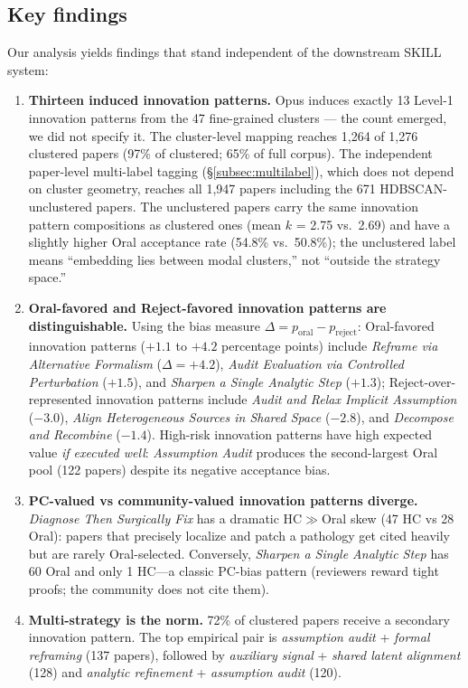 \documentclass[10pt,a4paper]{article}
\begin{document}
\subsection{Key findings}

Our analysis yields findings that stand independent of the downstream SKILL system:

\begin{enumerate}[leftmargin=1.5em]
\item \textbf{Thirteen induced innovation patterns.} Opus induces exactly 13 Level-1 innovation patterns from the 47 fine-grained clusters --- the count emerged, we did not specify it. The cluster-level mapping reaches 1{,}264 of 1{,}276 clustered papers (97\% of clustered; 65\% of full corpus). The independent paper-level multi-label tagging (\S\ref{subsec:multilabel}), which does not depend on cluster geometry, reaches all 1{,}947 papers including the 671 HDBSCAN-unclustered papers. The unclustered papers carry the same innovation pattern compositions as clustered ones (mean $k$ = 2.75 vs.\ 2.69) and have a slightly higher Oral acceptance rate (54.8\% vs.\ 50.8\%); the unclustered label means ``embedding lies between modal clusters,'' not ``outside the strategy space.''
\item \textbf{Oral-favored and Reject-favored innovation patterns are distinguishable.} Using the bias measure $\Delta = p_\text{oral} - p_\text{reject}$: Oral-favored innovation patterns (${+}1.1$ to ${+}4.2$ percentage points) include \emph{Reframe via Alternative Formalism} ($\Delta{=}{+}4.2$), \emph{Audit Evaluation via Controlled Perturbation} (${+}1.5$), and \emph{Sharpen a Single Analytic Step} (${+}1.3$); Reject-over-represented innovation patterns include \emph{Audit and Relax Implicit Assumption} (${-}3.0$), \emph{Align Heterogeneous Sources in Shared Space} (${-}2.8$), and \emph{Decompose and Recombine} (${-}1.4$). High-risk innovation patterns have high expected value \emph{if executed well}: \emph{Assumption Audit} produces the second-largest Oral pool (122 papers) despite its negative acceptance bias.
\item \textbf{PC-valued vs community-valued innovation patterns diverge.} \emph{Diagnose Then Surgically Fix} has a dramatic HC$\gg$Oral skew (47 HC vs 28 Oral): papers that precisely localize and patch a pathology get cited heavily but are rarely Oral-selected. Conversely, \emph{Sharpen a Single Analytic Step} has 60 Oral and only 1 HC---a classic PC-bias pattern (reviewers reward tight proofs; the community does not cite them).
\item \textbf{Multi-strategy is the norm.} 72\% of clustered papers receive a secondary innovation pattern. The top empirical pair is \emph{assumption audit} + \emph{formal reframing} (137 papers), followed by \emph{auxiliary signal} + \emph{shared latent alignment} (128) and \emph{analytic refinement} + \emph{assumption audit} (120).

\end{enumerate}
\end{document}
